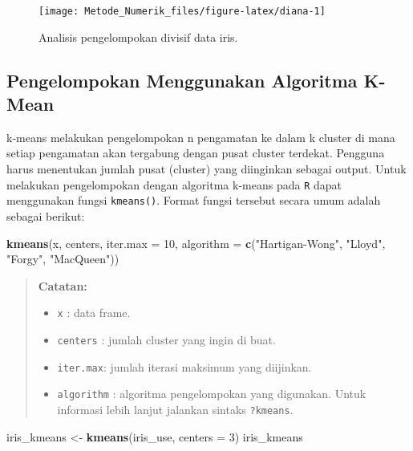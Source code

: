 \documentclass[
]{book}
\newenvironment{Shaded}{\begin{snugshade}}{\end{snugshade}}
\newcommand{\AttributeTok}[1]{\textcolor[rgb]{0.13,0.29,0.53}{#1}}
\newcommand{\DecValTok}[1]{\textcolor[rgb]{0.00,0.00,0.81}{#1}}
\newcommand{\FunctionTok}[1]{\textcolor[rgb]{0.13,0.29,0.53}{\textbf{#1}}}
\newcommand{\NormalTok}[1]{#1}
\newcommand{\OtherTok}[1]{\textcolor[rgb]{0.56,0.35,0.01}{#1}}
\newcommand{\StringTok}[1]{\textcolor[rgb]{0.31,0.60,0.02}{#1}}
\providecommand{\tightlist}{%
  \setlength{\itemsep}{0pt}\setlength{\parskip}{0pt}}
\theoremstyle{definition}
\theoremstyle{definition}
\theoremstyle{definition}
\theoremstyle{definition}
\theoremstyle{remark}
\begin{document}
\begin{figure}

{\centering \texttt{[image: Metode\_Numerik\_files/figure-latex/diana-1]} 

}

\caption{Analisis pengelompokan divisif data iris.}\label{fig:diana}
\end{figure}

\hypertarget{pengelompokan-menggunakan-algoritma-k-mean}{%
\subsection{Pengelompokan Menggunakan Algoritma K-Mean}\label{pengelompokan-menggunakan-algoritma-k-mean}}

k-means melakukan pengelompokan n pengamatan ke dalam k cluster di mana setiap pengamatan akan tergabung dengan pusat cluster terdekat. Pengguna harus menentukan jumlah pusat (cluster) yang diinginkan sebagai output. Untuk melakukan pengelompokan dengan algoritma k-means pada \texttt{R} dapat menggunakan fungsi \texttt{kmeans()}. Format fungsi tersebut secara umum adalah sebagai berikut:

\begin{Shaded}
\begin{Highlighting}[]
\FunctionTok{kmeans}\NormalTok{(x, centers, }\AttributeTok{iter.max =} \DecValTok{10}\NormalTok{,}
       \AttributeTok{algorithm =} \FunctionTok{c}\NormalTok{(}\StringTok{"Hartigan{-}Wong"}\NormalTok{, }\StringTok{"Lloyd"}\NormalTok{, }\StringTok{"Forgy"}\NormalTok{,}
                     \StringTok{"MacQueen"}\NormalTok{))}
\end{Highlighting}
\end{Shaded}

\begin{quote}
\textbf{Catatan:}

\begin{itemize}
\tightlist
\item
  \texttt{x} : data frame.
\item
  \texttt{centers} : jumlah cluster yang ingin di buat.
\item
  \texttt{iter.max}: jumlah iterasi maksimum yang diijinkan.
\item
  \texttt{algorithm} : algoritma pengelompokan yang digunakan. Untuk informasi lebih lanjut jalankan sintaks \texttt{?kmeans}.
\end{itemize}
\end{quote}

\begin{Shaded}
\begin{Highlighting}[]
\NormalTok{iris\_kmeans }\OtherTok{\textless{}{-}} \FunctionTok{kmeans}\NormalTok{(iris\_use, }\AttributeTok{centers =} \DecValTok{3}\NormalTok{)}
\NormalTok{iris\_kmeans}
\end{Highlighting}
\end{Shaded}
\end{document}
